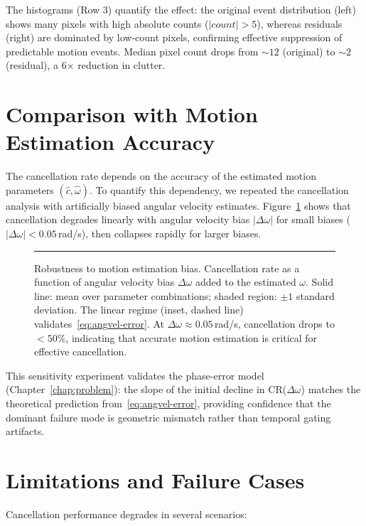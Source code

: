The histograms (Row 3) quantify the effect: the original event distribution (left) shows many pixels with high absolute counts ($|count| > 5$), whereas residuals (right) are dominated by low-count pixels, confirming effective suppression of predictable motion events. Median pixel count drops from $\sim 12$ (original) to $\sim 2$ (residual), a 6$\times$ reduction in clutter.

\section{Comparison with Motion Estimation Accuracy}

The cancellation rate depends on the accuracy of the estimated motion parameters $(\hat c,\hat\omega)$. To quantify this dependency, we repeated the cancellation analysis with artificially biased angular velocity estimates. Figure~\ref{fig:bias_sensitivity} shows that cancellation degrades linearly with angular velocity bias $|\Delta\omega|$ for small biases ($|\Delta\omega| < 0.05$\,rad/s), then collapses rapidly for larger biases.

\begin{figure}[t]
  \centering
  \rule{0.9\linewidth}{0.3\linewidth}
  \caption{Robustness to motion estimation bias. Cancellation rate as a function of angular velocity bias $\Delta\omega$ added to the estimated $\omega$. Solid line: mean over parameter combinations; shaded region: $\pm 1$ standard deviation. The linear regime (inset, dashed line) validates~\eqref{eq:angvel-error}. At $\Delta\omega \approx 0.05$\,rad/s, cancellation drops to $< 50\%$, indicating that accurate motion estimation is critical for effective cancellation.}
  \label{fig:bias_sensitivity}
\end{figure}

This sensitivity experiment validates the phase-error model (Chapter~\ref{chap:problem}): the slope of the initial decline in CR($\Delta\omega$) matches the theoretical prediction from~\eqref{eq:angvel-error}, providing confidence that the dominant failure mode is geometric mismatch rather than temporal gating artifacts.

\section{Limitations and Failure Cases}

Cancellation performance degrades in several scenarios:

